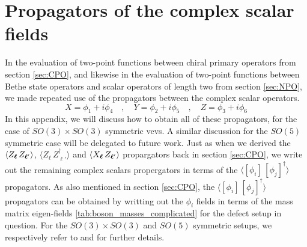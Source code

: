 %
\section{Propagators of the complex scalar fields}\label{app:complex propagators}
In the evaluation of two-point functions between chiral primary operators from section \ref{sec:CPO}, and likewise in the evaluation of two-point functions between Bethe state operators and scalar operators of length two from section \ref{sec:NPO}, we made repeated use of the propagators between the complex scalar operators.
%
%
\begin{equation}\label{complex scalars}
X = \phi_1 + i \phi_4
%
\quad , \quad
%
Y = \phi_2 + i \phi_5
%
\quad , \quad
%
Z = \phi_3 + i \phi_6
\end{equation}
%
%
In this appendix, we will discuss how to obtain all of these propagators, for the case of $SO(3) \times SO(3)$ symmetric vevs. A similar discussion for the $SO(5)$ symmetric case will be delegated to future work. Just as when we derived the $\expval{Z_{\boldsymbol{\ell}} \, Z_{\boldsymbol{\ell}'}}$, $\langle Z_{\boldsymbol{\ell}} \, Z^\dagger_{\boldsymbol{\ell}'} \rangle$ and $\expval{X_{\boldsymbol{\ell}} \, Z_{\boldsymbol{\ell}'}}$ propargators back in section \ref{sec:CPO}, we write out the remaining complex scalars propergators in terms of the $\langle [\phi_i] \, [\phi_j]^\dagger \rangle$ propagators. As also mentioned in section \ref{sec:CPO}, the $\langle [\phi_i] \, [\phi_j]^\dagger \rangle$ propagators can be obtained by writting out the $\phi_i$ fields in terms of the mass matrix eigen-fields \ref{tab:boson_masses_complicated} for the defect setup in question. For the $SO(3) \times SO(3)$ and $SO(5)$ symmetric setups, we respectively refer to \cite{One-point functions in D3-D7} and \cite{One-point functions in D3-D7 SO(5)} for further details. 

